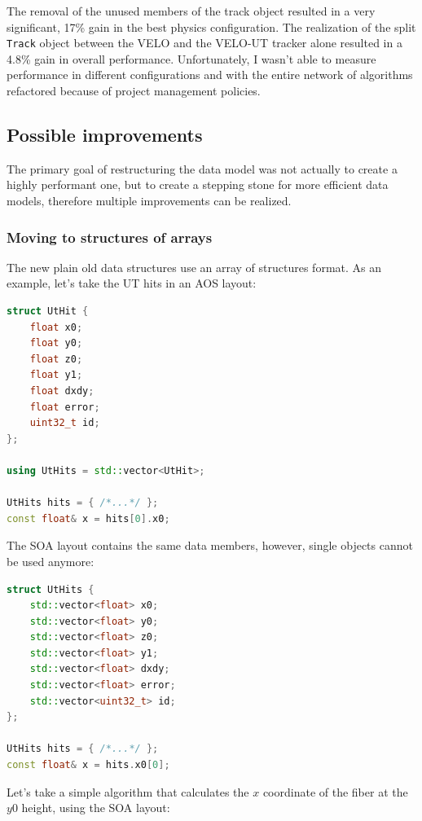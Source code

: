 \documentclass[12pt]{article}
\newcommand{\code}[1]{\texttt{#1}}
\begin{document}
The removal of the unused members of the track object resulted in a very significant, 17\% gain in the best physics configuration. The realization of the split \code{Track} object between the VELO and the VELO-UT tracker alone resulted in a 4.8\% gain in overall performance. Unfortunately, I wasn't able to measure performance in different configurations and with the entire network of algorithms refactored because of project management policies.


\subsection{Possible improvements}\label{sec_data_model_possible_improvements}

The primary goal of restructuring the data model was not actually to create a highly performant one, but to create a stepping stone for more efficient data models, therefore multiple improvements can be realized.

\subsubsection{Moving to structures of arrays}

The new plain old data structures use an array of structures format. As an example, let's take the UT hits in an AOS layout:

\begin{lstlisting}[language=C++]
struct UtHit {
	float x0;
	float y0;
	float z0;
	float y1;
	float dxdy;
	float error;
	uint32_t id;
};

using UtHits = std::vector<UtHit>;

UtHits hits = { /*...*/ };
const float& x = hits[0].x0;
\end{lstlisting}

The SOA layout contains the same data members, however, single objects cannot be used anymore:

\begin{lstlisting}[language=C++]
struct UtHits {
	std::vector<float> x0;
	std::vector<float> y0;
	std::vector<float> z0;
	std::vector<float> y1;
	std::vector<float> dxdy;
	std::vector<float> error;
	std::vector<uint32_t> id;
};

UtHits hits = { /*...*/ };
const float& x = hits.x0[0];
\end{lstlisting}

Let's take a simple algorithm that calculates the $x$ coordinate of the fiber at the $y0$ height, using the SOA layout:
\end{document}
